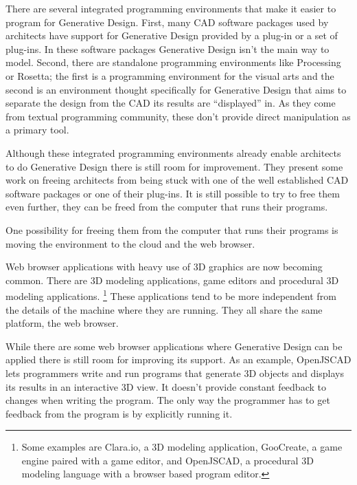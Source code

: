 \documentclass{./llncs2e/llncs}
\begin{document}
	There are several integrated programming environments that make it easier to program for Generative Design. 
	First, many CAD software packages used by architects have support for Generative Design provided by a plug-in or a set of plug-ins.
	In these software packages Generative Design isn't the main way to model.
	Second, there are standalone programming environments like Processing\cite{reas2007processing} or Rosetta\cite{de2012modern}; the first is a programming environment for the visual arts and the second is an environment thought specifically for Generative Design that aims to separate the design from the CAD its results are ``displayed'' in. 
	As they come from textual programming community, these don't provide direct manipulation as a primary tool.

	Although these integrated programming environments already enable architects to do Generative Design there is still room for improvement.
	They present some work on freeing architects from being stuck with one of the well established CAD software packages or one of their plug-ins.
	It is still possible to try to free them even further, they can be freed from the computer that runs their programs.

	One possibility for freeing them from the computer that runs their programs is moving the environment to the cloud and the web browser.


	Web browser applications with heavy use of 3D graphics are now becoming common.
	There are 3D modeling applications, game editors and procedural 3D modeling applications.
	\footnote{Some examples are Clara.io, a 3D modeling application, GooCreate, a game engine paired with a game editor, and OpenJSCAD, a procedural 3D modeling language with a browser based program editor.}
	These applications tend to be more independent from the details of the machine where they are running.
	They all share the same platform, the web browser.

	While there are some web browser applications where Generative Design can be applied there is still room for improving its support.
	As an example, OpenJSCAD lets programmers write and run programs that generate 3D objects and displays its results in an interactive 3D view.
	It doesn't provide constant feedback to changes when writing the program.
	The only way the programmer has to get feedback from the program is by explicitly running it.
\end{document}
